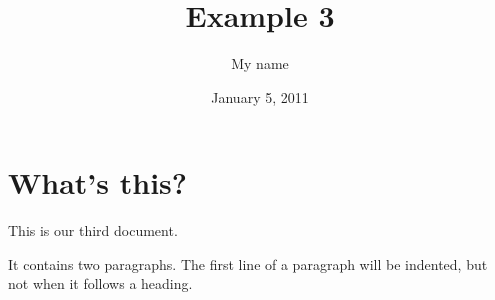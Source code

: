 \documentclass[a4paper,11pt]{article}
\begin{document}
\title{Example 3}
\author{My name}
\date{January 5, 2011}
\maketitle
\section{What's this?}
This           is   our
third document.

It contains two paragraphs. The first line of a paragraph will be
indented, but not when it follows a heading.
\end{document}
